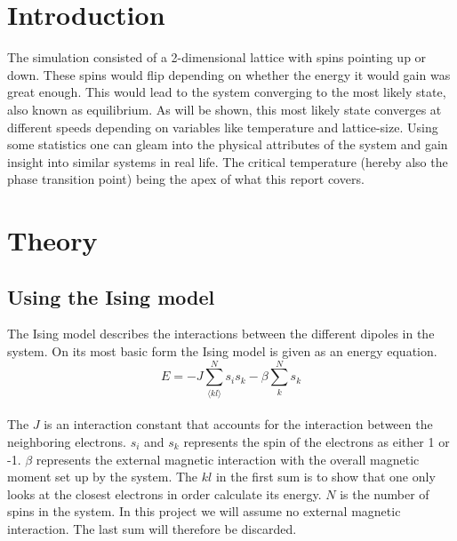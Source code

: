 \documentclass{article}
\begin{document}
\section{Introduction} \label{sec:Introduction}

The simulation consisted of a 2-dimensional lattice with spins pointing up or down. These spins would flip depending on whether the energy it would gain was great enough. This would lead to the system converging to the most likely state, also known as equilibrium. As will be shown, this most likely state converges at different speeds depending on variables like temperature and lattice-size. Using some statistics one can gleam into the physical attributes of the system and gain insight into similar systems in real life. The critical temperature (hereby also the phase transition point) being the apex of what this report covers. \\

\vspace{1cm}

\section{Theory} \label{sec:Theory}

\subsection{Using the Ising model} \label{sec:isingmodel}

The Ising model describes the interactions between the different dipoles in the system. On its most basic form the Ising model is given as an energy equation. \\

\begin{equation} \label{eq:isingmodel}
    E = -J \sum_{ \langle kl \rangle }^{N} s_i s_k - \beta \sum_{k}^{N}s_k
\end{equation} \\

The $J$ is an interaction constant that accounts for the interaction between the neighboring electrons. $s_i$ and $s_k$ represents the spin of the electrons as either 1 or -1. $\beta$ represents the external magnetic interaction with the overall magnetic moment set up by the system. The $kl$ in the first sum is to show that one only looks at the closest electrons in order calculate its energy. $N$ is the number of spins in the system. In this project we will assume no external magnetic interaction. The last sum will therefore be discarded. \cite{isingmodel} \\
\end{document}
